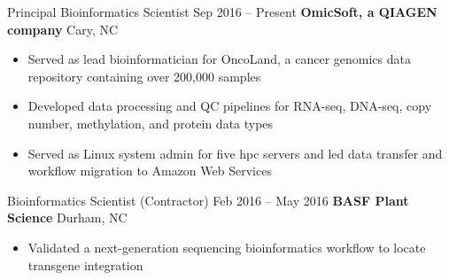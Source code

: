 
\begin{resentries}

  \resentrybeta
    {Principal Bioinformatics Scientist}
    {Sep 2016 -- Present}
    {\textbf{OmicSoft, a QIAGEN company}} %
    {Cary, NC} %
    {
      \begin{itemize}[leftmargin=*, itemsep=-1.5mm] %
        \item{Served as lead bioinformatician for OncoLand, a cancer genomics data repository containing over 200,000 samples}
        \item{Developed data processing and QC pipelines for RNA-seq, DNA-seq, copy number, methylation, and protein data types} 
        \item{Served as Linux system admin for five hpc servers and led data transfer and workflow migration to Amazon Web Services}
      \end{itemize}
    }

  \resentrybeta
    {Bioinformatics Scientist (Contractor)}
    {Feb 2016 -- May 2016}
    {\textbf{BASF Plant Science}}
    {Durham, NC}
    {
      \begin{itemize}[leftmargin=*, itemsep=-1.5mm] %
        \item{Validated a next-generation sequencing bioinformatics workflow to locate transgene integration}
      \end{itemize}
    }

\end{resentries}
